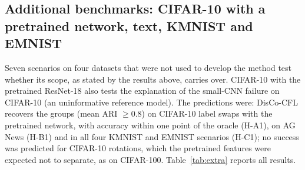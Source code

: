 \subsection{Additional benchmarks: CIFAR-10 with a pretrained network, text, KMNIST and EMNIST}\label{sec:extra}
Seven scenarios on four datasets that were not used to develop the method test whether its scope, as stated by the results above, carries over. CIFAR-10 with the pretrained ResNet-18 also tests the explanation of the small-CNN failure on CIFAR-10 (an uninformative reference model). The predictions were: DisCo-CFL recovers the groups (mean ARI $\ge0.8$) on CIFAR-10 label swaps with the pretrained network, with accuracy within one point of the oracle (H-A1), on AG News (H-B1) and in all four KMNIST and EMNIST scenarios (H-C1); no success was predicted for CIFAR-10 rotations, which the pretrained features were expected not to separate, as on CIFAR-100. Table~\ref{tab:extra} reports all results.

\begin{table}[!htbp]
\centering
\caption{Additional benchmarks (40 clients, 5 seeds; columns as in Table~\ref{tab:main}). CIFAR-10 (ResNet): pretrained ResNet-18 as in Section~\ref{sec:setup}. PACFL and FedDAG-C need image inputs and are not run on AG News.}\label{tab:extra}

\end{table}

\begin{table}[!htbp]
\centering
\caption*{Table~\ref{tab:extra} (continued).}

\end{table}

\begin{table}[!htbp]
\centering
\caption*{Table~\ref{tab:extra} (continued).}

\end{table}

